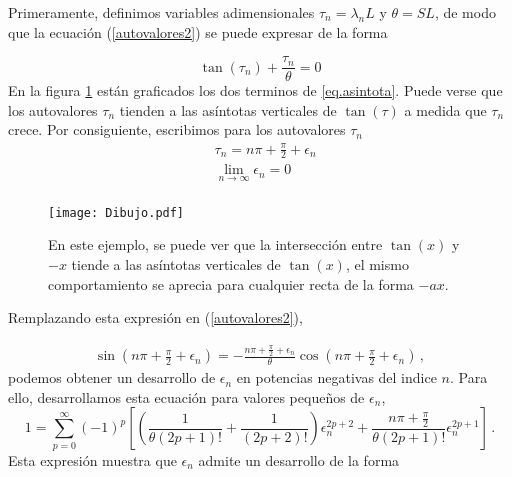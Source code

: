 Primeramente, definimos variables adimensionales $\tau _n = \lambda _n L $ y $\theta = S L $, de modo que la ecuación (\ref{autovalores2}) se puede expresar de la forma

\begin{equation}
    \tan (\tau _n) + \frac{\tau _n}{\theta} = 0
    \label{eq.asintota}
\end{equation}
En la figura \ref{fig:Dibujo1} están graficados los dos terminos de \ref{eq.asintota}. Puede verse que los autovalores $\tau _n$ tienden a las asíntotas verticales de $ \tan ( \tau ) $ a medida que $\tau _n$ crece. Por consiguiente, escribimos para los autovalores $\tau _n$ 
\begin{equation}
\begin{aligned}
    & \tau _n = n \pi + \frac{\pi}{2} + \epsilon _n \\[5pt]
    & \lim \limits_{ n \rightarrow \infty} \epsilon _n = 0 \\
\end{aligned}
\label{eq.mu}
\end{equation}
\begin{figure}
    \centering
    \texttt{[image: Dibujo.pdf]}
    \caption{En este ejemplo, se puede ver que la intersección entre $ \tan(x)$ y $-x$ tiende a las asíntotas verticales de $\tan (x) $, el mismo comportamiento se aprecia para cualquier recta de la forma $- a x$.}
    \label{fig:Dibujo1}
\end{figure}
Remplazando esta expresión en (\ref{autovalores2}),

\begin{equation}
\begin{aligned}
    \sin \left( n \pi + \frac{\pi}{2} + \epsilon _n \right) = -
    \frac{n \pi + \frac{\pi}{2} + \epsilon _n}{\theta} \cos \left( n \pi + \frac{\pi}{2} + \epsilon _n\right)
    \, ,
\end{aligned}
\end{equation}
podemos obtener un desarrollo de $\epsilon _n$ en potencias negativas del indice $n$. Para ello, desarrollamos esta ecuación para valores pequeños de $\epsilon _n$,   
\begin{equation}
    1 = 
    \sum _{p=0} ^{\infty} (-1) ^p     \left[
   	\left( \frac{1}{\theta (2p+1)!  } + \frac{1}{(2p+2)!} \right) \epsilon _n ^{2p+2 } +
  	\frac{n \pi + \frac{\pi}{2}}{\theta (2p+1)! }   \epsilon _n ^{2p+1} 			\right]
  	\, .
\label{igualdad epsilon}
\end{equation}
Esta expresión muestra que $\epsilon _n$ admite un desarrollo de la forma

